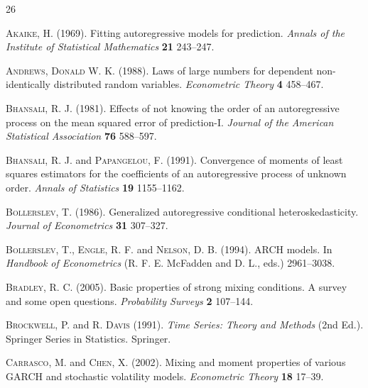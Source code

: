 \documentclass[ejsv2]{imsart}
\theoremstyle{plain}
\theoremstyle{definition}
\theoremstyle{remark}
\begin{document}
\begin{thebibliography}{26}

\textsc{Akaike, H.} (1969). Fitting autoregressive models for prediction. \textit{Annals of the Institute of Statistical Mathematics}
\textbf{21} 243--247.

\textsc{Andrews, Donald W. K.} (1988). Laws of large numbers for dependent non-identically distributed random variables. \textit{Econometric Theory} \textbf{4} 458--467.


\textsc{Bhansali, R. J.} (1981). Effects of not knowing the order of an autoregressive process on the
  mean squared error of prediction-I. \textit{Journal of the American Statistical Association}
\textbf{76} 588--597.

\textsc{Bhansali, R. J.} and \textsc{Papangelou, F.} (1991). Convergence of moments of least squares estimators for the
  coefficients of an autoregressive process of unknown order. \textit{Annals of Statistics}
\textbf{19} 1155--1162.

\textsc{Bollerslev, T.} (1986). Generalized autoregressive conditional heteroskedasticity. \textit{Journal of Econometrics}
\textbf{31} 307--327.

\textsc{Bollerslev, T.}, \textsc{Engle, R. F.} and \textsc{Nelson, D. B.} (1994). ARCH models. In \textit{Handbook of Econometrics} (R. F. E. McFadden and D. L., eds.) 2961--3038.

\textsc{Bradley, R. C.} (2005). Basic properties of strong mixing conditions. A survey and some open questions. \textit{Probability Surveys} \textbf{2} 107--144.

\textsc{Brockwell, P.} and \textsc{R. Davis} (1991). \textit{Time Series: Theory and Methods} (2nd Ed.). Springer Series in Statistics. Springer.

\textsc{Carrasco, M.} and \textsc{Chen, X.} (2002). Mixing and moment properties of various GARCH and stochastic volatility models. \textit{Econometric Theory} \textbf{18} 17--39.


\end{thebibliography}
\end{document}
